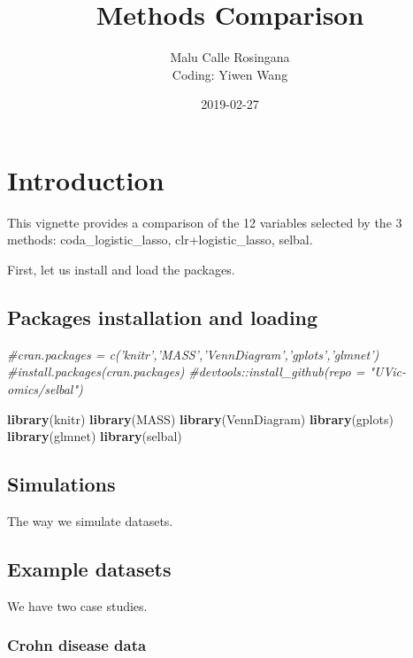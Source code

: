 \documentclass[]{book}
\title{Methods Comparison}
\author{Malu Calle Rosingana\\
Coding: Yiwen Wang}
\date{2019-02-27}
\newenvironment{Shaded}{\begin{snugshade}}{\end{snugshade}}
\newcommand{\KeywordTok}[1]{\textcolor[rgb]{0.13,0.29,0.53}{\textbf{#1}}}
\newcommand{\CommentTok}[1]{\textcolor[rgb]{0.56,0.35,0.01}{\textit{#1}}}
\newcommand{\NormalTok}[1]{#1}
\begin{document}
\maketitle

{
\setcounter{tocdepth}{3}
\tableofcontents
}
\chapter{Introduction}\label{introduction}

This vignette provides a comparison of the 12 variables selected by the
3 methods: coda\_logistic\_lasso, clr+logistic\_lasso, selbal.

First, let us install and load the packages.

\section{Packages installation and
loading}\label{packages-installation-and-loading}

\begin{Shaded}
\begin{Highlighting}[]
\CommentTok{#cran.packages = c('knitr','MASS','VennDiagram','gplots','glmnet')}
\CommentTok{#install.packages(cran.packages)}
\CommentTok{#devtools::install_github(repo = "UVic-omics/selbal")}

\KeywordTok{library}\NormalTok{(knitr)}
\KeywordTok{library}\NormalTok{(MASS)}
\KeywordTok{library}\NormalTok{(VennDiagram)}
\KeywordTok{library}\NormalTok{(gplots)}
\KeywordTok{library}\NormalTok{(glmnet)}
\KeywordTok{library}\NormalTok{(selbal)}
\end{Highlighting}
\end{Shaded}

\section{Simulations}\label{simulations}

The way we simulate datasets.

\section{Example datasets}\label{example-datasets}

We have two case studies.

\subsection{Crohn disease data}\label{crohn-disease-data}
\end{document}
